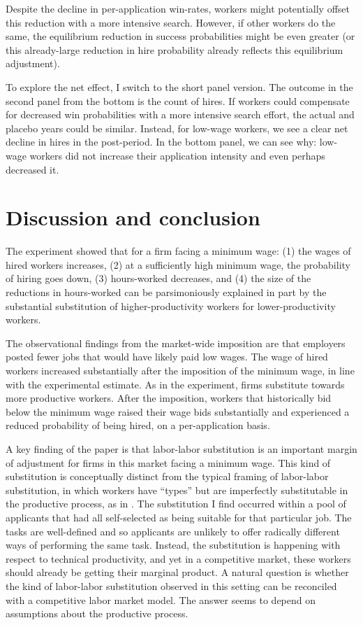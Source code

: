 \documentclass[AER]{AEA}
\begin{document}
Despite the decline in per-application win-rates, workers might potentially offset this reduction with a more intensive search. 
However, if other workers do the same, the equilibrium reduction in success probabilities might be even greater (or this already-large reduction in hire probability already reflects this equilibrium adjustment).  

To explore the net effect, I switch to the short panel version.
The outcome in the second panel from the bottom is the count of hires.
If workers could compensate for decreased win probabilities with a more intensive search effort, the actual and placebo years could be similar.
Instead, for low-wage workers, we see a clear net decline in hires in the post-period.
In the bottom panel, we can see why: low-wage workers did not increase their application intensity and even perhaps decreased it. 
 
\section{Discussion and conclusion} \label{sec:conclusion}

The experiment showed that for a firm facing a minimum wage:
(1) the wages of hired workers increases, 
(2) at a sufficiently high minimum wage, the probability of hiring goes down, 
(3) hours-worked decreases, and 
(4) the size of the reductions in hours-worked can be parsimoniously explained in part by the substantial substitution of higher-productivity workers for lower-productivity workers. 

The observational findings from the market-wide imposition are that employers posted fewer jobs that would have likely paid low wages. 
The wage of hired workers increased substantially after the imposition of the minimum wage, in line with the experimental estimate. 
As in the experiment, firms substitute towards more productive workers. 
After the imposition, workers that historically bid below the minimum wage raised their wage bids substantially and experienced a reduced probability of being hired, on a per-application basis. 

A key finding of the paper is that labor-labor substitution is an important margin of adjustment for firms in this market facing a minimum wage.
This kind of substitution is conceptually distinct from the typical framing of labor-labor substitution, in which workers have ``types'' but are imperfectly substitutable in the productive process, as in \cite{katz1992changes}. 
The substitution I find occurred within a pool of applicants that had all self-selected as being suitable for that particular job.
The tasks are well-defined and so applicants are unlikely to offer radically different ways of performing the same task.
Instead, the substitution is happening with respect to technical productivity, and yet in a competitive market, these workers should already be getting their marginal product.
A natural question is whether the kind of labor-labor substitution observed in this setting can be reconciled with a competitive labor market model.
The answer seems to depend on assumptions about the productive process.  
\end{document}

